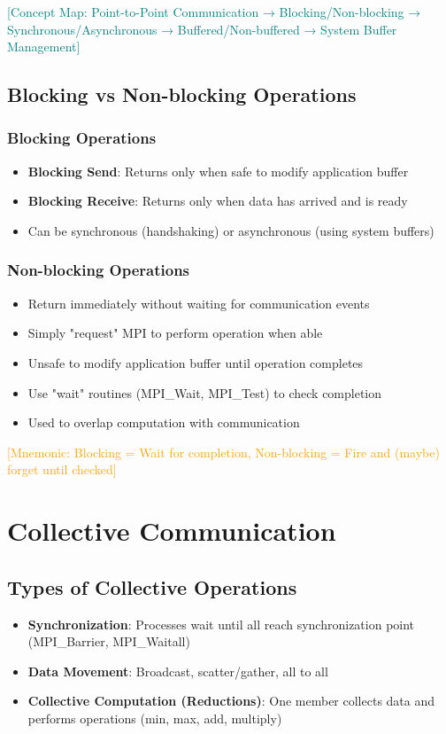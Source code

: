 \documentclass[12pt]{article}
\begin{document}
\textcolor{teal}{[Concept Map: Point-to-Point Communication → Blocking/Non-blocking → Synchronous/Asynchronous → Buffered/Non-buffered → System Buffer Management]}

\subsection{Blocking vs Non-blocking Operations}

\subsubsection{Blocking Operations}
\begin{itemize}
    \item \textbf{Blocking Send}: Returns only when safe to modify application buffer
    \item \textbf{Blocking Receive}: Returns only when data has arrived and is ready
    \item Can be synchronous (handshaking) or asynchronous (using system buffers)
\end{itemize}

\subsubsection{Non-blocking Operations}
\begin{itemize}
    \item Return immediately without waiting for communication events
    \item Simply "request" MPI to perform operation when able
    \item Unsafe to modify application buffer until operation completes
    \item Use "wait" routines (MPI\_Wait, MPI\_Test) to check completion
    \item Used to overlap computation with communication
\end{itemize}

\textcolor{orange}{[Mnemonic: Blocking = Wait for completion, Non-blocking = Fire and (maybe) forget until checked]}

\section{Collective Communication}

\subsection{Types of Collective Operations}
\begin{itemize}
    \item \textbf{Synchronization}: Processes wait until all reach synchronization point (MPI\_Barrier, MPI\_Waitall)
    \item \textbf{Data Movement}: Broadcast, scatter/gather, all to all
    \item \textbf{Collective Computation (Reductions)}: One member collects data and performs operations (min, max, add, multiply)
\end{itemize}
\end{document}
